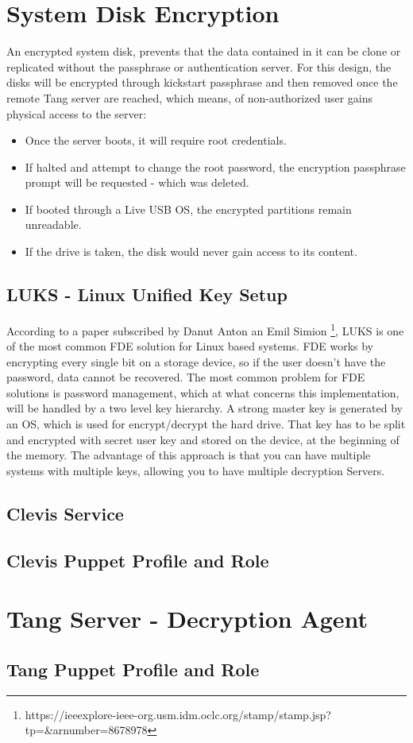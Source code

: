 \section{System Disk Encryption}

An encrypted system disk, prevents that the data contained in it can be clone or replicated without the passphrase or authentication server. For this design, the disks will be encrypted through kickstart passphrase and then removed once the remote Tang server are reached, which means, of non-authorized user gains physical access to the server:

\begin{itemize}
  \item Once the server boots, it will require root credentials.
  \item If halted and attempt to change the root password, the encryption passphrase prompt will be requested - which was deleted.
  \item If booted through a Live USB OS, the encrypted partitions remain unreadable.
  \item If the drive is taken, the disk would never gain access to its content.
\end{itemize}

\subsection{LUKS - Linux Unified Key Setup}

According to a paper subscribed by Danut Anton an Emil Simion \footnote[1]{https://ieeexplore-ieee-org.usm.idm.oclc.org/stamp/stamp.jsp?tp=\&arnumber=8678978}, LUKS is one of the most common FDE solution for Linux based systems.
FDE works by encrypting every single bit on a storage device, so if the user doesn't have the password, data cannot be recovered. The most common problem for FDE solutions is password management, which at what concerns this implementation, will be handled by a two level key hierarchy. A strong master key is generated by an OS, which is used for encrypt/decrypt the hard drive. That key has to be split and encrypted with secret user key and stored on the device, at the beginning of the memory. The advantage of this approach is that you can have multiple systems with multiple keys, allowing you to have multiple decryption Servers.

\newpage
\subsection{Clevis Service}

\newpage
\subsection{Clevis Puppet Profile and Role}


\newpage
\section{Tang Server - Decryption Agent}

\newpage
\subsection{Tang Puppet Profile and Role}

\newpage